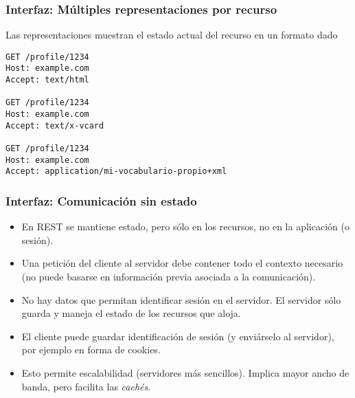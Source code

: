 \begin{frame}[fragile]
\frametitle{Interfaz: Múltiples representaciones por recurso}

Las representaciones muestran el estado actual del recurso en un formato dado

\begin{verbatim}
GET /profile/1234
Host: example.com
Accept: text/html

GET /profile/1234
Host: example.com
Accept: text/x-vcard

GET /profile/1234
Host: example.com
Accept: application/mi-vocabulario-propio+xml
\end{verbatim}


\end{frame}


\begin{frame}
\frametitle{Interfaz: Comunicación sin estado}

\begin{itemize}
\item En REST se mantiene estado, pero sólo en los recursos, no en la aplicación (o sesión). 

\item Una petición del cliente al servidor debe contener todo el contexto necesario (no puede basarse en información previa asociada a la comunicación). 

\item No hay datos que permitan identificar sesión en el servidor. El servidor sólo guarda y maneja el estado de los recursos que aloja. 

\item El cliente puede guardar identificación de sesión (y enviárselo al servidor), por ejemplo en forma de cookies.

\item Esto permite escalabilidad (servidores más sencillos). Implica mayor ancho de banda, pero facilita las \emph{cachés}.
\end{itemize}

\end{frame}



